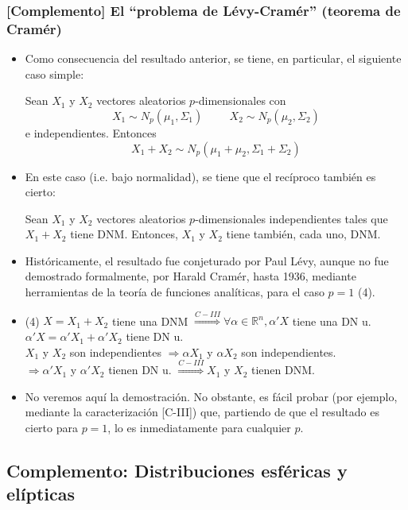 \documentclass[11pt,a4paper]{article}
\begin{document}
\subsubsection{[Complemento] El ``problema de Lévy-Cramér'' (teorema de Cramér)}
\begin{itemize}
\item Como consecuencia del resultado anterior, se tiene, en particular, el siguiente caso simple:

Sean $X_{1}$ y $X_{2}$ vectores aleatorios $p$-dimensionales con
$$X_{1} \sim N_{p}(\mu_{1}, \Sigma_{1}) \hspace{1cm} X_{2} \sim N_{p}(\mu_{2}, \Sigma_{2})$$
e independientes. Entonces
$$X_{1} + X_{2} \sim N_{p}(\mu_{1} + \mu_{2}, \Sigma_{1} + \Sigma_{2})$$

\item En este caso (i.e. bajo normalidad), se tiene que el recíproco también es cierto:

Sean $X_{1}$ y $X_{2}$ vectores aleatorios $p$-dimensionales independientes tales que $X_{1} + X_{2}$ tiene DNM. Entonces, $X_{1}$ y $X_{2}$ tiene también, cada uno, DNM.

\item Históricamente, el resultado fue conjeturado por Paul Lévy, aunque no fue demostrado formalmente, por Harald Cramér, hasta 1936, mediante herramientas de la teoría de funciones analíticas, para el caso $p=1$ (4).

\item (4) $X = X_{1} + X_{2}$ tiene una DNM $\overset{C-III}{\Rightarrow} \forall \alpha \in \mathbb{R}^{n}, \alpha'X$ tiene una DN u. \\
$\alpha'X = \alpha'X_{1} + \alpha'X_{2}$ tiene DN u. \\
$X_{1}$ y $X_{2}$ son independientes $\Rightarrow \alpha X_{1}$ y $\alpha X_{2}$ son independientes. \\
$\Rightarrow \alpha'X_{1}$ y $\alpha'X_{2}$ tienen DN u. $\overset{C-III}{\Rightarrow} X_{1}$ y $X_{2}$ tienen DNM.

\item No veremos aquí la demostración. No obstante, es fácil probar (por ejemplo, mediante la caracterización [C-III]) que, partiendo de que el resultado es cierto para $p=1$, lo es inmediatamente para cualquier $p$.
\end{itemize}

\subsection{Complemento: Distribuciones esféricas y elípticas}
\end{document}
